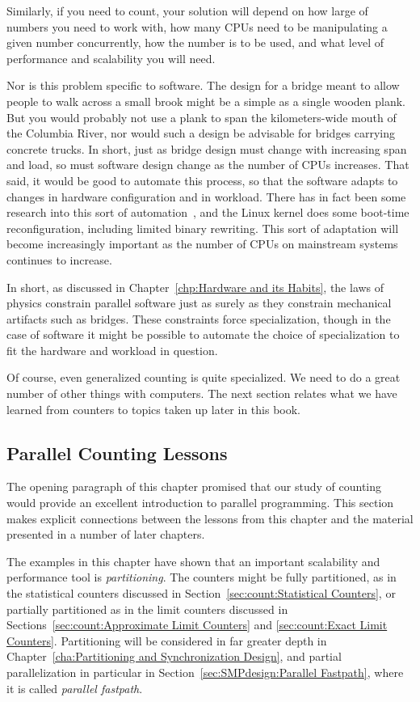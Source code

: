 Similarly, if you need to count, your solution will depend on how large
of numbers you need to work with, how many CPUs need to be manipulating
a given number concurrently, how the number is to be used, and what
level of performance and scalability you will need.

Nor is this problem specific to software.
The design for a bridge meant to allow people to walk across a small brook
might be a simple as a single wooden plank.
But you would probably not use a plank to span the kilometers-wide mouth of
the Columbia River, nor would such a design be advisable for bridges
carrying concrete trucks.
In short, just as bridge design must change with increasing span and load,
so must software design change as the number of CPUs increases.
That said, it would be good to automate this process, so that the
software adapts to changes in hardware configuration and in workload.
There has in fact been some research into this sort of
automation~\cite{Appavoo03a,Soules03a}, and the Linux kernel does some
boot-time reconfiguration, including limited binary rewriting.
This sort of adaptation will become increasingly important as the
number of CPUs on mainstream systems continues to increase.

In short, as discussed in
Chapter~\ref{chp:Hardware and its Habits},
the laws of physics constrain parallel software just as surely as they
constrain mechanical artifacts such as bridges.
These constraints force specialization, though in the case of software
it might be possible to automate the choice of specialization to
fit the hardware and workload in question.

Of course, even generalized counting is quite specialized.
We need to do a great number of other things with computers.
The next section relates what we have learned from counters to
topics taken up later in this book.

\subsection{Parallel Counting Lessons}
\label{sec:count:Parallel Counting Lessons}

The opening paragraph of this chapter promised that our study of counting
would provide an excellent introduction to parallel programming.
This section makes explicit connections between the lessons from
this chapter and the material presented in a number of later chapters.

The examples in this chapter have shown that an important scalability
and performance tool is \emph{partitioning}.
The counters might be fully partitioned, as in the statistical counters
discussed in Section~\ref{sec:count:Statistical Counters},
or partially partitioned as in the limit counters discussed in
Sections~\ref{sec:count:Approximate Limit Counters} and
\ref{sec:count:Exact Limit Counters}.
Partitioning will be considered in far greater depth in
Chapter~\ref{cha:Partitioning and Synchronization Design},
and partial parallelization in particular in
Section~\ref{sec:SMPdesign:Parallel Fastpath}, where it is called
\emph{parallel fastpath}.

